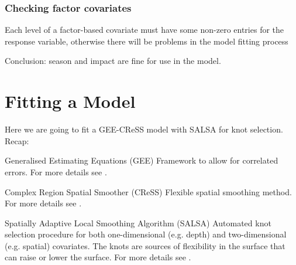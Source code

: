 \begin{frame}[fragile]
\frametitle{Checking factor covariates}
Each level of a factor-based covariate must have some non-zero entries for the response variable, otherwise there will be problems in the model fitting process 
\begin{knitrout}\footnotesize
{}\color{fgcolor}
\end{knitrout}
\begin{block}{}
Conclusion: season and impact are fine for use in the model.
\end{block}
\end{frame}
\section{Fitting a Model}
\label{sec:modfit}
\begin{frame}
Here we are going to fit a GEE-CReSS model with SALSA for knot selection. Recap:
\begin{block}{Generalised Estimating Equations (GEE)}
Framework to allow for correlated errors. For more details see \citet{Hardin2002}.
\end{block}

\begin{block}{Complex Region Spatial Smoother (CReSS)}
Flexible spatial smoothing method. For more details see \citet{ScottH2013}.
\end{block}

\begin{block}{Spatially Adaptive Local Smoothing Algorithm (SALSA)}
Automated knot selection procedure for both one-dimensional (e.g. depth) and two-dimensional (e.g. spatial) covariates.  The knots are sources of flexibility in the surface that can raise or lower the surface. For more details see \citet{Walker2010}.
\end{block}
\end{frame}


